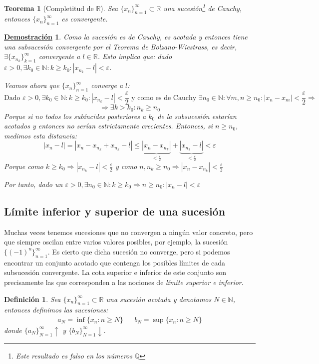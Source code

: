 \documentclass[10pt,a4paper,openright]{book}
\theoremstyle{break}
\newtheorem{defi}{Definición}[chapter]
\newtheorem{theo}{Teorema}[chapter]
\newtheorem*{demo}{\underline{Demostración}}
\begin{document}
\begin{theo}[Completitud de $\mathbb R$]
Sea $\{x_n\}_{n=1}^\infty\subset \mathbb R$ una sucesión\footnote{Este resultado es falso en los números $\mathbb Q$} de Cauchy, entonces $\{x_n\}_{n=1}^\infty$ es convergente.
\end{theo}
\begin{demo}
Como la sucesión es de Cauchy, es acotada y entonces tiene una subsucesión convergente por el Teorema de Bolzano-Wiestrass, es decir, $\exists \{x_{n_k}\}_{k=1}^\infty$ convergente a $l\in \mathbb R$. Esto implica que: dado $\varepsilon>0, \exists k_0\in \mathbb N: k\geq k_0: |x_{n_k}-l|<\varepsilon$.\par

Veamos ahora que $\{x_n\}_{n=1}^\infty$ converge a $l$:
$$\mbox{Dado }\varepsilon>0, \exists k_0\in \mathbb N: k\geq k_0: |x_{n_k}-l|<\frac{\varepsilon}{2}\mbox{ y como es de Cauchy }\exists n_0\in\mathbb N: \forall m,n\geq n_0: |x_n-x_m|<\frac{\varepsilon}{2}\Rightarrow$$
$$\Rightarrow \exists k>k_0: n_k\geq n_0$$
Porque si no todos los subíncides posteriores a $k_0$ de la subsucesión estarían acotados y entonces no serían estrictamente crecientes.
Entonces, si $n\geq n_0$, medimos esta distancia:
$$|x_n-l|=|x_n-x_{n_k}+x_{n_k}-l|\leq \underbrace{|x_n-x_{n_k}|}_{< \frac{\varepsilon}{2}}+\underbrace{|x_{n_k}-l|}_{< \frac{\varepsilon}{2}}<\varepsilon$$
Porque como $k\geq k_0\Rightarrow |x_{n_k}-l|<\frac{\varepsilon}{2}$ y como $n,n_k\geq n_0\Rightarrow |x_n-x_{n_k}|<\frac{\varepsilon}{2}$

Por tanto, dado un $\varepsilon>0,\exists n_0\in \mathbb N: k\geq k_0\Rightarrow n\geq n_0: |x_n-l|<\varepsilon$
\end{demo}

\subsection{Límite inferior y superior de una sucesión}
Muchas veces tenemos sucesiones que no convergen a ningún valor concreto, pero que siempre oscilan entre varios valores posibles, por ejemplo, la sucesión $\{(-1)^n\}_{n=1}^\infty$. Es cierto que dicha sucesión no converge, pero si podemos encontrar un conjunto acotado que contenga los posibles límites de cada subsucesión convergente. La cota superior e inferior de este conjunto son precisamente las que corresponden a las nociones de \textit{límite superior e inferior}.

\begin{defi}
Sea $\{x_n\}_{n=1}^\infty\subset \mathbb R$ una sucesión acotada y denotamos $N\in \mathbb N$, entonces definimos las sucesiones:
\begin{align*}
a_N=\inf\{x_n: n\geq N\} & & b_N=\sup\{x_n: n\geq N\}
\end{align*}
donde $\{a_N\}_{N=1}^\infty \uparrow$ y $\{b_N\}_{N=1}^\infty \downarrow$.
\end{defi}
\end{document}
